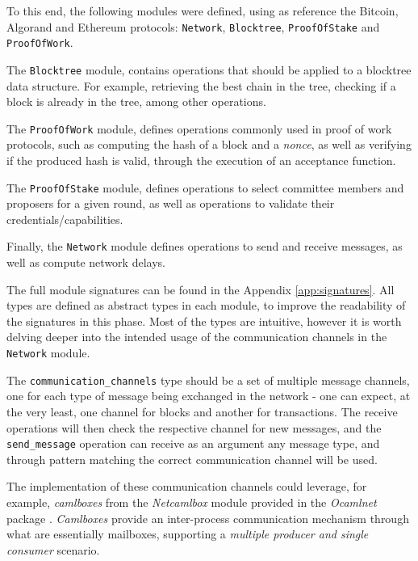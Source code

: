 To this end, the following modules were defined, using as reference the Bitcoin, Algorand and Ethereum protocols: \texttt{Network}, \texttt{Blocktree}, \texttt{ProofOfStake} and \texttt{ProofOfWork}.

The \texttt{Blocktree} module, contains operations that should be applied to a blocktree data structure. For example, retrieving the best chain in the tree, checking if a block is already in the tree, among other operations.

The \texttt{ProofOfWork} module, defines operations commonly used in proof of work protocols, such as computing the hash of a block and a \textit{nonce}, as well as verifying if the produced hash is valid, through the execution of an acceptance function.

The \texttt{ProofOfStake} module, defines operations to select committee members and proposers for a given round, as well as operations to validate their credentials/capabilities.

Finally, the \texttt{Network} module defines operations to send and receive messages, as well as compute network delays.

The full module signatures can be found in the Appendix \ref{app:signatures}. All types are defined as abstract types in each module, to improve the readability of the signatures in this phase. Most of the types are intuitive, however it is worth delving deeper into the intended usage of the communication channels in the \texttt{Network} module.

The \texttt{communication\_channels} type should be a set of multiple message channels, one for each type of message being exchanged in the network - one can expect, at the very least, one channel for blocks and another for transactions. The receive operations will then check the respective channel for new messages, and the \texttt{send\_message} operation can receive as an argument any message type, and through pattern matching the correct communication channel will be used.

The implementation of these communication channels could leverage, for example, \textit{camlboxes} from the \textit{Netcamlbox} module provided in the \textit{Ocamlnet} package \cite{ocamlnet}. \textit{Camlboxes} provide an inter-process communication mechanism through what are essentially mailboxes, supporting a \textit{multiple producer and single consumer} scenario.











